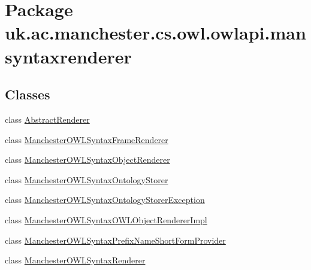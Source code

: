 \hypertarget{namespaceuk_1_1ac_1_1manchester_1_1cs_1_1owl_1_1owlapi_1_1mansyntaxrenderer}{\section{Package uk.\-ac.\-manchester.\-cs.\-owl.\-owlapi.\-mansyntaxrenderer}
\label{namespaceuk_1_1ac_1_1manchester_1_1cs_1_1owl_1_1owlapi_1_1mansyntaxrenderer}
}
\subsection*{Classes}
\begin{DoxyCompactItemize}
\item 
class \hyperlink{classuk_1_1ac_1_1manchester_1_1cs_1_1owl_1_1owlapi_1_1mansyntaxrenderer_1_1_abstract_renderer}{Abstract\-Renderer}
\item 
class \hyperlink{classuk_1_1ac_1_1manchester_1_1cs_1_1owl_1_1owlapi_1_1mansyntaxrenderer_1_1_manchester_o_w_l_syntax_frame_renderer}{Manchester\-O\-W\-L\-Syntax\-Frame\-Renderer}
\item 
class \hyperlink{classuk_1_1ac_1_1manchester_1_1cs_1_1owl_1_1owlapi_1_1mansyntaxrenderer_1_1_manchester_o_w_l_syntax_object_renderer}{Manchester\-O\-W\-L\-Syntax\-Object\-Renderer}
\item 
class \hyperlink{classuk_1_1ac_1_1manchester_1_1cs_1_1owl_1_1owlapi_1_1mansyntaxrenderer_1_1_manchester_o_w_l_syntax_ontology_storer}{Manchester\-O\-W\-L\-Syntax\-Ontology\-Storer}
\item 
class \hyperlink{classuk_1_1ac_1_1manchester_1_1cs_1_1owl_1_1owlapi_1_1mansyntaxrenderer_1_1_manchester_o_w_l_syntax_ontology_storer_exception}{Manchester\-O\-W\-L\-Syntax\-Ontology\-Storer\-Exception}
\item 
class \hyperlink{classuk_1_1ac_1_1manchester_1_1cs_1_1owl_1_1owlapi_1_1mansyntaxrenderer_1_1_manchester_o_w_l_syntax_o_w_l_object_renderer_impl}{Manchester\-O\-W\-L\-Syntax\-O\-W\-L\-Object\-Renderer\-Impl}
\item 
class \hyperlink{classuk_1_1ac_1_1manchester_1_1cs_1_1owl_1_1owlapi_1_1mansyntaxrenderer_1_1_manchester_o_w_l_syn9b805e7397984f62b2f3f095697b987e}{Manchester\-O\-W\-L\-Syntax\-Prefix\-Name\-Short\-Form\-Provider}
\item 
class \hyperlink{classuk_1_1ac_1_1manchester_1_1cs_1_1owl_1_1owlapi_1_1mansyntaxrenderer_1_1_manchester_o_w_l_syntax_renderer}{Manchester\-O\-W\-L\-Syntax\-Renderer}

\end{DoxyCompactItemize}
